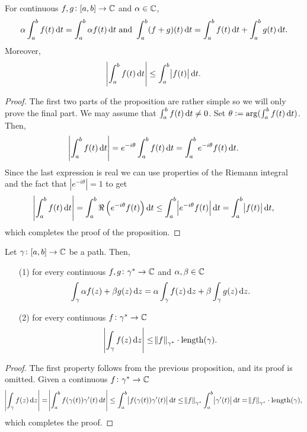 \documentclass[11pt,a4paper]{article}
\newcommand{\length}{\mathrm{length}}
\begin{document}
\begin{proposition}
  For continuous $f,g \colon [a,b] \to \mathbb{C}$ and $\alpha \in \mathbb{C}$,
  \[
    \alpha \int_{a}^{b} f(t) \dt =
    \int_{a}^{b} \alpha f(t) \dt \stand
    \int_{a}^{b} (f + g)(t) \dt =
    \int_{a}^{b} f(t) \dt +
    \int_{a}^{b} g(t) \dt.
  \]
  Moreover,
  \[
    \abs{\int_{a}^{b} f(t) \dt} \le
    \int_{a}^{b} \abs{f(t)} \dt.
  \]
\end{proposition}
\begin{proof}
  The first two parts of the proposition are rather simple so we will only
  prove the final part.
  We may assume that $\int_a^b f(t) \dt \neq 0$.
  Set $\theta := \arg(\int_a^b f(t) \dt)$. Then,
  \[
    \abs{\int_{a}^{b} f(t) \dt} =
    e^{- i \theta} \int_{a}^{b} f(t) \dt =
    \int_{a}^{b} e^{- i \theta} f(t) \dt.
  \]
  Since the last expression is real we can use properties of the Riemann
  integral and the fact that $|e^{- i \theta}| = 1$ to get
  \[
    \abs{\int_{a}^{b} f(t) \dt} =
    \int_{a}^{b} \Re\del{e^{- i \theta} f(t)} \dt \le
    \int_{a}^{b} \abs{e^{- i \theta} f(t)} \dt =
    \int_{a}^{b} \abs{f(t)} \dt,
  \]
  which completes the proof of the proposition.
\end{proof}

\begin{proposition}
  Let $\gamma \colon [a, b] \to \mathbb{C}$ be a path. Then,
  \begin{enumerate}
    \item[(1)] for every continuous $f, g \colon \gamma^* \to \mathbb{C}$ and 
      $\alpha, \beta \in \mathbb{C}$
      \[
        \int_{\gamma} \alpha f(z) + \beta g(z) \dz =
        \alpha \int_{\gamma} f(z) \dz +
        \beta \int_{\gamma} g(z) \dz.
      \]
    \item[(2)] for every continuous $f \colon \gamma^* \to \mathbb{C}$
      \[
        \abs{\int_{\gamma} f(z) \dz} \le
        \norm{f}_{\gamma^*} \cdot \length(\gamma).
      \]
  \end{enumerate}
\end{proposition}
\begin{proof}
  The first property follows from the previous proposition, and its proof is
  omitted.
  Given a continuous $f \colon \gamma^* \to \mathbb{C}$
  \[
    \abs{\int_{\gamma} f(z) \dz} =
    \abs{\int_{a}^{b} f(\gamma(t)) \gamma'(t) \dt} \le
    \int_{a}^{b} \abs{f(\gamma(t)) \gamma'(t)} \dt \le
    \norm{f}_{\gamma^*} \int_{a}^{b} \abs{\gamma'(t)} \dt =
    \norm{f}_{\gamma^*} \cdot \length(\gamma),
  \]
  which completes the proof.
\end{proof}
\end{document}
